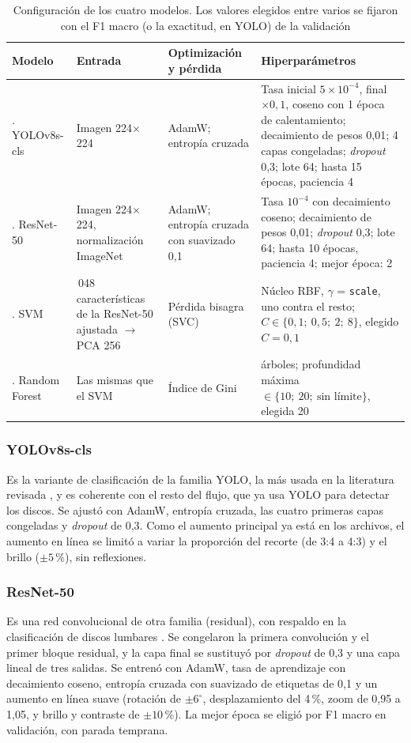 \begin{table}[t]
\centering\footnotesize
\caption{Configuración de los cuatro modelos. Los valores elegidos entre varios se fijaron con el F1 macro (o la exactitud, en YOLO) de la validación}
\label{tab:hiper}
\begin{tabular}{>{\raggedright\arraybackslash}p{}>{\raggedright\arraybackslash}p{}>{\raggedright\arraybackslash}p{}>{\raggedright\arraybackslash}p{}}
\toprule
Modelo & Entrada & Optimización y pérdida & Hiperparámetros \\
\midrule
1. YOLOv8s-cls & Imagen 224$\times$224 & AdamW; entropía cruzada & Tasa inicial $5\times10^{-4}$, final $\times 0{,}1$, coseno con 1 época de calentamiento; decaimiento de pesos 0,01; 4 capas congeladas; \emph{dropout} 0,3; lote 64; hasta 15 épocas, paciencia 4 \\
2. ResNet-50 & Imagen 224$\times$224, normalización ImageNet & AdamW; entropía cruzada con suavizado 0,1 & Tasa $10^{-4}$ con decaimiento coseno; decaimiento de pesos 0,01; \emph{dropout} 0,3; lote 64; hasta 10 épocas, paciencia 4; mejor época: 2 \\
3. SVM & 2\,048 características de la ResNet-50 ajustada $\to$ PCA 256 & Pérdida bisagra (SVC) & Núcleo RBF, $\gamma$ = \texttt{scale}, uno contra el resto; $C\in\{0{,}1;\ 0{,}5;\ 2;\ 8\}$, elegido $C=0{,}1$ \\
4. Random Forest & Las mismas que el SVM & Índice de Gini & 300 árboles; profundidad máxima $\in\{10;\ 20;\ \text{sin límite}\}$, elegida 20 \\
\bottomrule
\end{tabular}
\end{table}

\subsubsection{YOLOv8s-cls}
Es la variante de clasificación de la familia YOLO, la más usada en la literatura revisada \cite{liawrungrueang2023,prisilla2023,wang2025}, y es coherente con el resto del flujo, que ya usa YOLO para detectar los discos. Se ajustó con AdamW, entropía cruzada, las cuatro primeras capas congeladas y \emph{dropout} de 0,3. Como el aumento principal ya está en los archivos, el aumento en línea se limitó a variar la proporción del recorte (de 3:4 a 4:3) y el brillo ($\pm 5\,\%$), sin reflexiones.

\subsubsection{ResNet-50}
Es una red convolucional de otra familia (residual), con respaldo en la clasificación de discos lumbares \cite{tan2024,alkubaisi2022}. Se congelaron la primera convolución y el primer bloque residual, y la capa final se sustituyó por \emph{dropout} de 0,3 y una capa lineal de tres salidas. Se entrenó con AdamW, tasa de aprendizaje con decaimiento coseno, entropía cruzada con suavizado de etiquetas de 0,1 y un aumento en línea suave (rotación de $\pm 6^{\circ}$, desplazamiento del 4\,\%, zoom de 0,95 a 1,05, y brillo y contraste de $\pm 10\,\%$). La mejor época se eligió por F1 macro en validación, con parada temprana.

